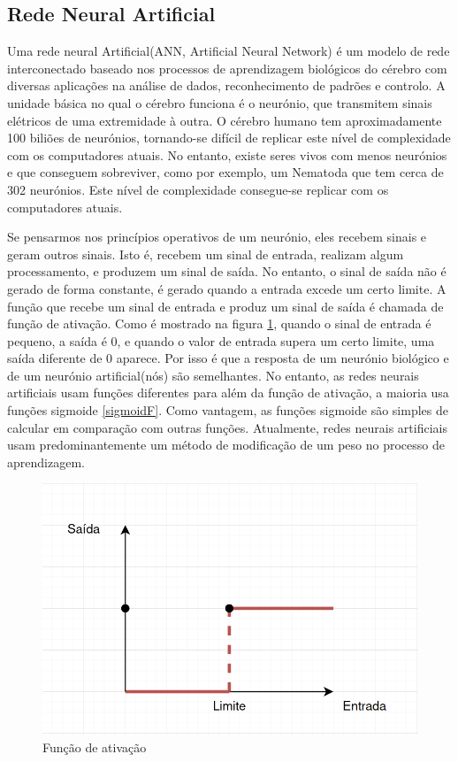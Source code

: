 \subsection{Rede Neural Artificial}

Uma rede neural Artificial(ANN, Artificial Neural Network) é um modelo de rede interconectado baseado nos processos de aprendizagem biológicos do cérebro com diversas aplicações na análise de dados, reconhecimento de padrões e controlo. 
A unidade básica no qual o cérebro funciona é o neurónio, que transmitem sinais elétricos de uma extremidade à outra. O cérebro humano tem aproximadamente 100 biliões de neurónios, tornando-se difícil de replicar este nível de complexidade com os computadores atuais. No entanto, existe seres vivos com menos neurónios e que conseguem sobreviver, como por exemplo, um Nematoda que tem cerca de 302 neurónios. Este nível de complexidade consegue-se replicar com os computadores atuais.

Se pensarmos nos princípios operativos de um neurónio, eles recebem sinais e geram outros sinais. Isto é, recebem um sinal de entrada, realizam algum processamento, e produzem um sinal de saída. No entanto, o sinal de saída não é gerado de forma constante, é gerado quando a entrada excede um certo limite. A função que recebe um sinal de entrada e produz um sinal de saída é chamada de função de ativação. Como é mostrado na figura \ref{ativaçãoF}, quando o sinal de entrada é pequeno, a saída é 0, e quando o valor de entrada supera um certo limite, uma saída diferente de 0 aparece. Por isso é que a resposta de um neurónio biológico e de um neurónio artificial(nós) são semelhantes. No entanto, as redes neurais artificiais usam funções diferentes para além da função de ativação, a maioria usa funções sigmoide \ref{sigmoidF}. Como vantagem, as funções sigmoide são simples de calcular em comparação com outras funções. Atualmente, redes neurais artificiais usam predominantemente um método de modificação de um peso no processo de aprendizagem.



\begin{figure}[H]
\centering
\includegraphics[scale=0.4]{figs/activation_function}
\caption{Função de ativação }\label{ativaçãoF}
\end{figure}


